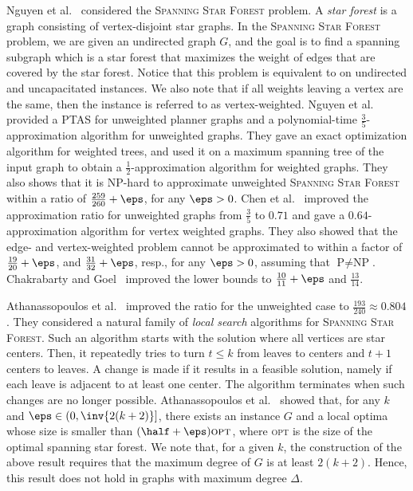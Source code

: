 Nguyen et al.~\cite{nguyen2008approximating} considered the
\textsc{Spanning Star Forest} problem.  A \emph{star forest} is a
graph consisting of vertex-disjoint star graphs.  In the
\textsc{Spanning Star Forest} problem, we are given an undirected
graph $G$, and the goal is to find a spanning subgraph which is a star
forest that maximizes the weight of edges that are covered by the star
forest.  Notice that this problem is equivalent to \carpool on
undirected and uncapacitated instances.  We also note that if all
weights leaving a vertex are the same, then the instance is referred
to as vertex-weighted.
%
Nguyen et al.~\cite{nguyen2008approximating} provided a PTAS for
unweighted planner graphs and a polynomial-time
$\frac{3}{5}$-approximation algorithm for unweighted graphs.  They
gave an exact optimization algorithm for weighted trees, and used it
on a maximum spanning tree of the input graph to obtain a
$\frac{1}{2}$-approximation algorithm for weighted graphs.  They also
shows that it is NP-hard to approximate unweighted \textsc{Spanning
Star Forest} within a ratio of $\frac{259}{260}+\eps$, for any
$\eps>0$.
%
%
Chen et al.~\cite{CENRRS13} improved the approximation ratio for
unweighted graphs from $\frac{3}{5}$ to $0.71$ and gave a
$0.64$-approximation algorithm for vertex weighted graphs.  They also
showed that the edge- and vertex-weighted problem cannot be
approximated to within a factor of $\frac{19}{20} + \eps$, and
$\frac{31}{32} + \eps$, resp., for any $\eps > 0$, assuming that
$\text{P} \neq \text{NP}$.
%
Chakrabarty and Goel~\cite{ChakrabartyGoel10} improved the lower bounds
to $\frac{10}{11} + \eps$ and $\frac{13}{14}$.

Athanassopoulos et al.~\cite{ACKK09} improved the ratio for the
unweighted case to $\frac{193}{240} \approx 0.804$.
%
They considered a natural family of \emph{local search} algorithms for
\textsc{Spanning Star Forest}.  Such an algorithm starts with the
solution where all vertices are star centers.  Then, it repeatedly
tries to turn $t \leq k$ from leaves to centers and $t+1$ centers to
leaves.  A change is made if it results in a feasible solution, namely
if each leave is adjacent to at least one center.  The algorithm
terminates when such changes are no longer possible.
%
Athanassopoulos et al.~\cite{ACKK09} showed that, for any $k$ and
$\eps \in (0,\inv{2(k+2)}]$, there exists an instance $G$ and a local
optima whose size is smaller than $(\half + \eps) \textsc{opt}$,
where \textsc{opt} is the size of the optimal spanning star forest.
We note that, for a given $k$, the construction of the above result
requires that the maximum degree of $G$ is at least $2(k+2)$.  Hence,
this result does not hold in graphs with maximum degree $\Delta$.

